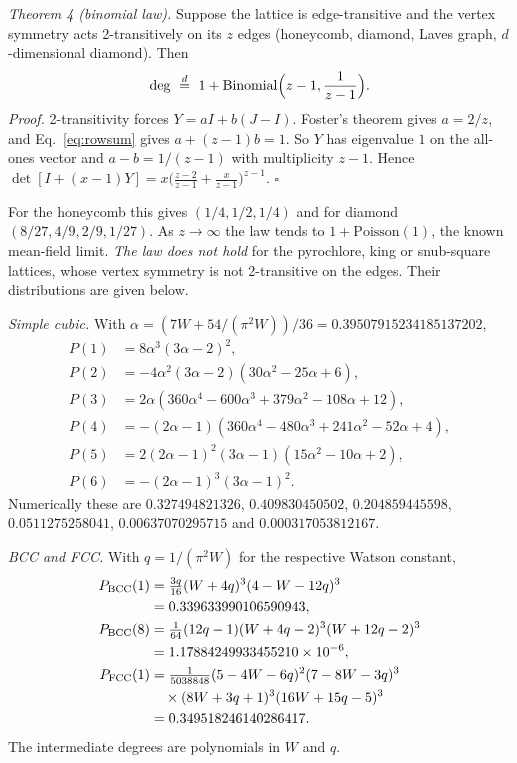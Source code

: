 \documentclass[aps,pra,10pt,twocolumn,superscriptaddress,nofootinbib]{revtex4-2}
\begin{document}
\emph{Theorem 4 (binomial law).} Suppose the lattice is edge-transitive and the vertex symmetry
acts 2-transitively on its $z$ edges (honeycomb, diamond, Laves graph, $d$-dimensional
diamond). Then
\begin{equation}
\deg\ \stackrel{d}{=}\ 1+\mathrm{Binomial}\Bigl(z-1,\frac1{z-1}\Bigr).
\end{equation}
\emph{Proof.} 2-transitivity forces $Y=aI+b(J-I)$. Foster's theorem gives $a=2/z$, and
Eq.~\eqref{eq:rowsum} gives $a+(z-1)b=1$. So $Y$ has eigenvalue $1$ on the all-ones vector and
$a-b=1/(z-1)$ with multiplicity $z-1$. Hence
$\det[I+(x-1)Y]=x\bigl(\tfrac{z-2}{z-1}+\tfrac{x}{z-1}\bigr)^{z-1}$. $\square$

For the honeycomb this gives $(1/4,1/2,1/4)$ and for diamond $(8/27,4/9,2/9,1/27)$. As
$z\to\infty$ the law tends to $1+\mathrm{Poisson}(1)$, the known mean-field limit.
\emph{The law does not hold} for the pyrochlore, king or snub-square lattices, whose
vertex symmetry is not 2-transitive on the edges. Their distributions are given below.

\emph{Simple cubic.} With $\alpha=(7W+54/(\pi^2W))/36=0.39507915234185137202$,
\begin{align}
P(1)&=8\alpha^3(3\alpha-2)^2,\nonumber\\
P(2)&=-4\alpha^2(3\alpha-2)(30\alpha^2-25\alpha+6),\nonumber\\
P(3)&=2\alpha(360\alpha^4-600\alpha^3+379\alpha^2-108\alpha+12),\nonumber\\
P(4)&=-(2\alpha-1)(360\alpha^4-480\alpha^3+241\alpha^2-52\alpha+4),\nonumber\\
P(5)&=2(2\alpha-1)^2(3\alpha-1)(15\alpha^2-10\alpha+2),\nonumber\\
P(6)&=-(2\alpha-1)^3(3\alpha-1)^2 .
\end{align}
Numerically these are $0.327494821326$, $0.409830450502$, $0.204859445598$, $0.0511275258041$,
$0.00637070295715$ and $0.000317053812167$.

\emph{BCC and FCC.} With $q=1/(\pi^2W)$ for the respective Watson constant,
\begin{align}
P_{\rm BCC}(1)&=\tfrac{3q}{16}(W+4q)^3(4-W-12q)^3\nonumber\\
&=0.339633990106590943,\nonumber\\
P_{\rm BCC}(8)&=\tfrac1{64}(12q-1)(W+4q-2)^3(W+12q-2)^3\nonumber\\
&=1.17884249933455210\times10^{-6},\\
P_{\rm FCC}(1)&=\tfrac{1}{5038848}(5-4W-6q)^2(7-8W-3q)^3\nonumber\\
&\quad\times(8W+3q+1)^3(16W+15q-5)^3\nonumber\\
&=0.349518246140286417 .
\end{align}
The intermediate degrees are polynomials in $W$ and $q$.
\end{document}
